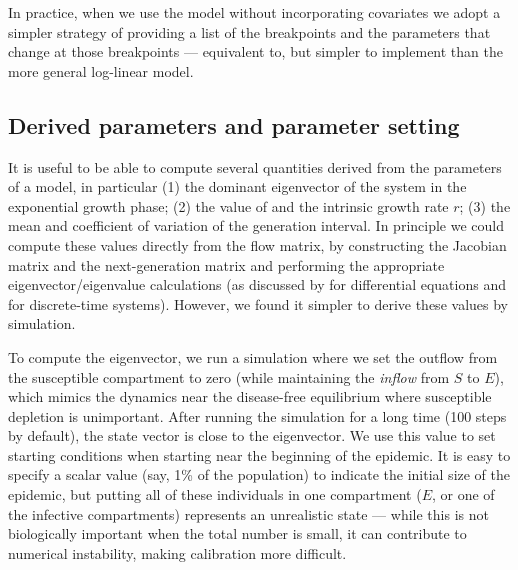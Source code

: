 \documentclass[12pt]{article}\usepackage[]{graphicx}\usepackage[]{color}
\begin{document}
In practice, when we use the model without incorporating covariates we adopt a simpler strategy of providing a list of the breakpoints and the parameters that change at those breakpoints --- equivalent to, but simpler to implement than the more general log-linear model.


\subsection*{Derived parameters and parameter setting}

It is useful to be able to compute several quantities derived from the parameters of a model, in particular (1) the dominant eigenvector of the system in the exponential growth phase; (2) the value of \Rzero and the intrinsic growth rate $r$; (3) the mean and coefficient of variation of the generation interval. In principle we could compute these values directly from the flow matrix, by constructing the Jacobian matrix and the next-generation matrix and performing the appropriate eigenvector/eigenvalue calculations (as discussed by \cite{VandWatm02} for differential equations and \cite{Casw00} for discrete-time systems). However, we found it simpler to derive these values by simulation.

To compute the eigenvector, we run a simulation where we set the outflow from the susceptible compartment to zero (while maintaining the \emph{inflow} from $S$ to $E$), which mimics the dynamics near the disease-free equilibrium where susceptible depletion is unimportant. After running the simulation for a long time (100 steps by default), the state vector is close to the eigenvector.  We use this value to set starting conditions when starting near the beginning of the epidemic. It is easy to specify a scalar value (say, 1\% of the population) to indicate the initial size of the epidemic, but putting all of these individuals in one compartment ($E$, or one of the infective compartments) represents an unrealistic state --- while this is not biologically important when the total number is small, it can contribute to numerical instability, making calibration more difficult.
\end{document}
